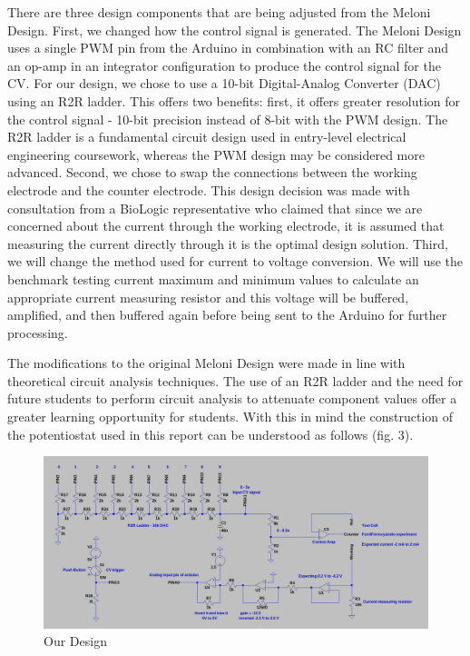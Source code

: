\documentclass{article}
\begin{document}
There are three design components that are being adjusted from the Meloni Design. First, we changed how the control signal is generated. The Meloni Design uses a single PWM pin from the Arduino in combination with an RC filter and an op-amp in an integrator configuration to produce the control signal for the CV. For our design, we chose to use a 10-bit Digital-Analog Converter (DAC) using an R2R ladder. This offers two benefits: first, it offers greater resolution for the control signal - 10-bit precision instead of 8-bit with the PWM design. The R2R ladder is a fundamental circuit design used in entry-level electrical engineering coursework, whereas the PWM design may be considered more advanced. Second, we chose to swap the connections between the working electrode and the counter electrode. This design decision was made with consultation from a BioLogic representative who claimed that since we are concerned about the current through the working electrode, it is assumed that measuring the current directly through it is the optimal design solution. Third, we will change the method used for current to voltage conversion. We will use the benchmark testing current maximum and minimum values to calculate an appropriate current measuring resistor and this voltage will be buffered, amplified, and then buffered again before being sent to the Arduino for further processing.

The modifications to the original Meloni Design were made in line with theoretical circuit analysis techniques. The use of an R2R ladder and the need for future students to perform circuit analysis to attenuate component values offer a greater learning opportunity for students. With this in mind the construction of the potentiostat used in this report can be understood as follows (fig. 3).

\begin{figure}[h]
    \centering
    \includegraphics[width=.9\linewidth]{diy_design.png}
    \caption{Our Design}
\end{figure}
\end{document}
